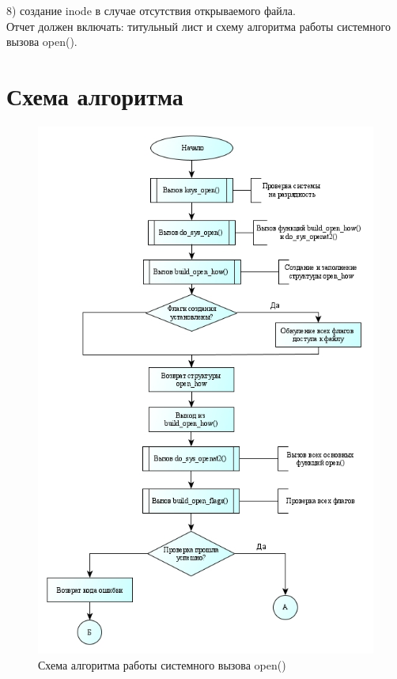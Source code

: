8)	создание inode в случае отсутствия открываемого файла.\\
Отчет должен включать: титульный лист и схему алгоритма работы системного вызова open().
\newpage
\section*{Схема алгоритма}

\begin{figure}[h!]
	\caption{Схема алгоритма работы системного вызова open()}
	\center\includegraphics[scale=0.75]{img/1.jpg}
	
\end{figure}
